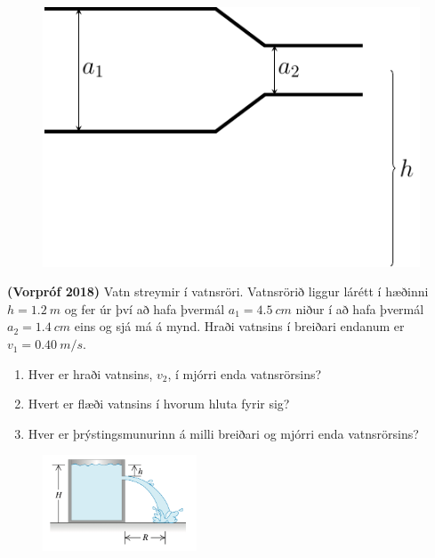 \ifdefined \wholebook \else\documentclass[oneside]{book}\usepackage{EdlBook}\graphicspath{{figures/}}
\begin{document}
\begin{enumerate}[label = \textbf{Dæmi \thechapter.\arabic*.}]
\begin{minipage}{\linewidth}
\begin{figure}
\vspace{-0.5cm}
\includegraphics[scale=0.6]{images/pipe_test.pdf}
\end{figure}

\item \textbf{(Vorpróf 2018)} Vatn streymir í vatnsröri. Vatnsrörið liggur lárétt í hæðinni $h = \SI{1.2}{m}$ og fer úr því að hafa þvermál $a_1 = \SI{4.5}{cm}$ niður í að hafa þvermál $a_2=\SI{1.4}{cm}$ eins og sjá má á mynd. Hraði vatnsins í breiðari endanum er $v_1 = \SI{0.40}{m/s}$.
\begin{enumerate}[label = \textbf{(\alph*)}]
    \item Hver er hraði vatnsins, $v_2$, í mjórri enda vatnsrörsins?
    \item Hvert er flæði vatnsins í hvorum hluta fyrir sig?
    \item Hver er þrýstingsmunurinn á milli breiðari og mjórri enda vatnsrörsins?
\end{enumerate}
\end{minipage}


\begin{minipage}{\linewidth}
\begin{figure}
\vspace{-0.5cm}
\includegraphics[width = 1.8in]{images/vatnstankur.png}
\end{figure}


\end{minipage}
\end{enumerate}
\end{document}
